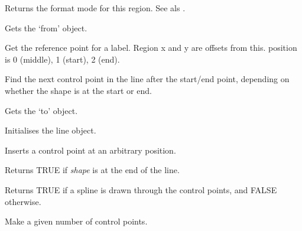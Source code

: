 Returns the format mode for this region. See als .



Gets the `from' object.



Get the reference point for a label. Region x and y are offsets from this.
position is 0 (middle), 1 (start), 2 (end).



Find the next control point in the line after the start/end point,
depending on whether the shape is at the start or end.



Gets the `to' object.



Initialises the line object.



Inserts a control point at an arbitrary position.



Returns TRUE if {\it shape} is at the end of the line.



Returns TRUE if a spline is drawn through the control points, and FALSE otherwise.



Make a given number of control points.



